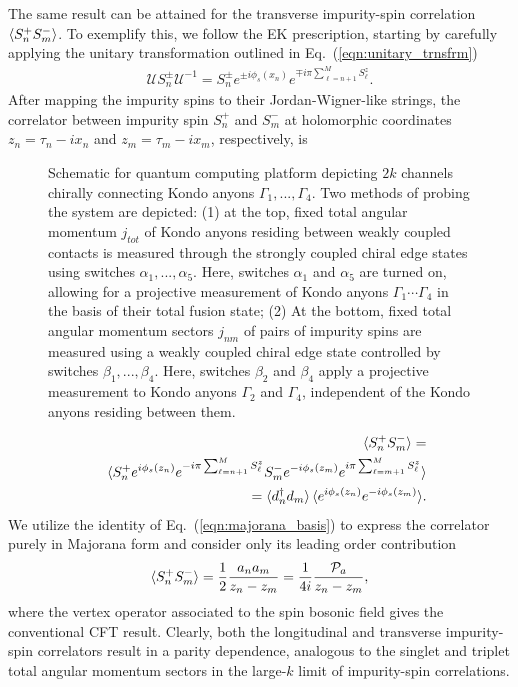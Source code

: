 \documentclass[aps,prb,twocolumn,superscriptaddress]{revtex4-1}
\begin{document}
The same result can be attained for the transverse impurity-spin correlation $\braket{S_{n}^{+}S_{m}^{-}}$. To exemplify this, we follow the EK prescription, starting by carefully applying the unitary transformation outlined in Eq.~(\ref{eqn:unitary_trnsfrm})
\begin{eqnarray}
\mathcal{U}S_{n}^{\pm}\mathcal{U}^{-1}=S_{n}^{\pm}e^{\pm i\phi_{s}(x_{n})}e^{\mp i\pi\sum_{\ell=n+1}^{M}S_{\ell}^{z}}. \label{eqn:unitary_trnsfrm_S}
\end{eqnarray}
After mapping the impurity spins to their Jordan-Wigner-like strings, the  correlator between impurity spin $S_{n}^{+}$ and $S_{m}^{-}$ at holomorphic coordinates $z_{n}=\tau_{n}-ix_{n}$ and $z_{m}=\tau_{m}-ix_{m}$, respectively, is
\begin{figure}[!ht]
	\caption{Schematic for quantum computing platform depicting $2k$ channels chirally connecting Kondo anyons $\Gamma_{1},...,\Gamma_{4}$. Two methods of probing the system are depicted: (1) at the top, fixed total angular momentum $j_{tot}$ of Kondo anyons residing between weakly coupled contacts is measured through the strongly coupled chiral edge states using switches $\alpha_{1},...,\alpha_{5}$. Here, switches $\alpha_{1}$ and $\alpha_{5}$ are turned on, allowing for a projective measurement of Kondo anyons $\Gamma_{1}\cdots\Gamma_{4}$ in the basis of their total fusion state; (2) At the bottom, fixed total angular momentum sectors $j_{nm}$ of pairs of impurity spins are measured using a weakly coupled chiral edge state controlled by switches $\beta_{1},...,\beta_{4}$. Here, switches $\beta_{2}$ and $\beta_{4}$ apply a projective measurement to Kondo anyons $\Gamma_{2}$ and $\Gamma_{4}$, independent of the Kondo anyons residing between them.}
	\label{fig:1d_model} 
\end{figure}
\begin{eqnarray}
&&\langle{S_{n}^{+}S_{m}^{-}\rangle}= \nonumber \\
&&\braket{S_{n}^{+}e^{i\phi_{s}(z_{n})}e^{-i\pi\sum_{\ell=n+1}^{M}S_{\ell}^{z}}S_{m}^{-}e^{-i\phi_{s}(z_{m})}e^{i\pi\sum_{\ell=m+1}^{M}S_{\ell}^{z}}} \nonumber \\
&&=\braket{d_{n}^{\dagger}d_{m}}\langle{e^{i\phi_{s}(z_{n})}e^{-i\phi_{s}(z_{m})}\rangle}. \label{eqn:corr_Ispin_EK_i2pm}
\end{eqnarray} 
We utilize the identity of Eq.~(\ref{eqn:majorana_basis}) to express the correlator purely in Majorana form and consider only its leading order contribution 
\begin{eqnarray}
\braket{S_{n}^{+}S_{m}^{-}}=\frac{1}{2}\frac{a_{n}a_{m}}{z_{n}-z_{m}}=\frac{1}{4i}\frac{\mathcal{P}_{a}}{z_{n}-z_{m}}, \label{eqn:corr_Ispin_EK_ii2pm}
\end{eqnarray}
where the vertex operator associated to the spin bosonic field gives the conventional CFT result. Clearly, both the longitudinal and transverse impurity-spin correlators result in a parity dependence, analogous to the singlet and triplet total angular momentum sectors in the large-$k$ limit of impurity-spin correlations. 
\end{document}

